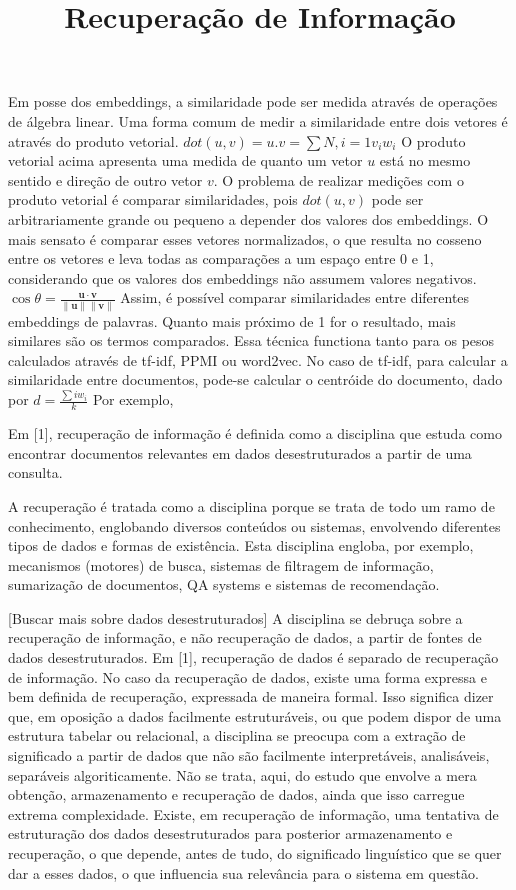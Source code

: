 Em posse dos embeddings, a similaridade pode ser medida através de operações de álgebra linear.
Uma forma comum de medir a similaridade entre dois vetores é através do produto vetorial.
$dot(u,v) = u.v = \sum{N, i=1}v_{i}w_{i}$
O produto vetorial acima apresenta uma medida de quanto um vetor $u$ está no mesmo sentido e direção de outro vetor $v$.
O problema de realizar medições com o produto vetorial é comparar similaridades, pois $dot(u,v)$ pode ser arbitrariamente
grande ou pequeno a depender dos valores dos embeddings.
O mais sensato é comparar esses vetores normalizados, o que resulta no cosseno entre os vetores e leva todas as comparações
a um espaço entre 0 e 1, considerando que os valores dos embeddings não assumem valores negativos.
$\cos \theta = \frac{\mathbf{u} \cdot \mathbf{v}}{\|\mathbf{u}\| \|\mathbf{v}\|}$
Assim, é possível comparar similaridades entre diferentes embeddings de palavras.
Quanto mais próximo de 1 for o resultado, mais similares são os termos comparados.
Essa técnica functiona tanto para os pesos calculados através de tf-idf, PPMI ou word2vec.
No caso de tf-idf, para calcular a similaridade entre documentos, pode-se calcular o centróide do documento, dado por
$d = \frac{\sum{i}w_{i}}{k}$
Por exemplo,


\title{Recuperação de Informação}

Em [1], recuperação de informação é definida como a disciplina que estuda como encontrar documentos relevantes em dados 
desestruturados a partir de uma consulta.

A recuperação é tratada como a disciplina porque se trata de todo um ramo de conhecimento, englobando diversos conteúdos 
ou sistemas, envolvendo diferentes tipos de dados e formas de existência. Esta disciplina engloba, por exemplo, mecanismos 
(motores) de busca, sistemas de filtragem de informação, sumarização de documentos, QA systems e sistemas de recomendação.

[Buscar mais sobre dados desestruturados]
A disciplina se debruça sobre a recuperação de informação, e não recuperação de dados, a partir de fontes de dados desestruturados. 
Em [1], recuperação de dados é separado de recuperação de informação. No caso da recuperação de dados, existe uma forma expressa e bem definida de recuperação, expressada de maneira formal.
Isso significa dizer que, em oposição a dados facilmente estruturáveis, ou que podem dispor de uma estrutura tabelar ou relacional, 
a disciplina se preocupa com a extração de significado a partir de dados que não são facilmente interpretáveis, analisáveis, separáveis algoriticamente. 
Não se trata, aqui, do estudo que envolve a mera obtenção, armazenamento e recuperação de dados, ainda que isso carregue 
extrema complexidade. 
Existe, em recuperação de informação, uma tentativa de estruturação dos dados desestruturados para posterior armazenamento e recuperação, o que depende, antes de 
tudo, do significado linguístico que se quer dar a esses dados, o que influencia sua relevância para o sistema em questão.


